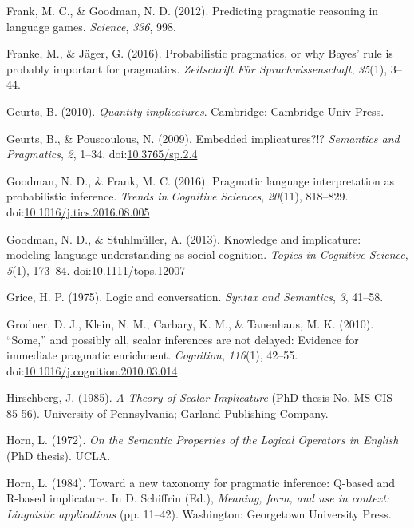 \documentclass[man]{apa6}
\theoremstyle{definition}
\theoremstyle{definition}
\theoremstyle{definition}
\theoremstyle{remark}
\begin{document}
\hypertarget{ref-Frank2012}{}
Frank, M. C., \& Goodman, N. D. (2012). Predicting pragmatic reasoning
in language games. \emph{Science}, \emph{336}, 998.

\hypertarget{ref-Franke2016}{}
Franke, M., \& Jäger, G. (2016). Probabilistic pragmatics, or why Bayes'
rule is probably important for pragmatics. \emph{Zeitschrift Für
Sprachwissenschaft}, \emph{35}(1), 3--44.

\hypertarget{ref-Geurts2010}{}
Geurts, B. (2010). \emph{Quantity implicatures}. Cambridge: Cambridge
Univ Press.

\hypertarget{ref-Geurts2009}{}
Geurts, B., \& Pouscoulous, N. (2009). Embedded implicatures?!?
\emph{Semantics and Pragmatics}, \emph{2}, 1--34.
doi:\href{https://doi.org/10.3765/sp.2.4}{10.3765/sp.2.4}

\hypertarget{ref-Goodman2016}{}
Goodman, N. D., \& Frank, M. C. (2016). Pragmatic language
interpretation as probabilistic inference. \emph{Trends in Cognitive
Sciences}, \emph{20}(11), 818--829.
doi:\href{https://doi.org/10.1016/j.tics.2016.08.005}{10.1016/j.tics.2016.08.005}

\hypertarget{ref-Goodman2013}{}
Goodman, N. D., \& Stuhlmüller, A. (2013). Knowledge and implicature:
modeling language understanding as social cognition. \emph{Topics in
Cognitive Science}, \emph{5}(1), 173--84.
doi:\href{https://doi.org/10.1111/tops.12007}{10.1111/tops.12007}

\hypertarget{ref-grice1975}{}
Grice, H. P. (1975). Logic and conversation. \emph{Syntax and
Semantics}, \emph{3}, 41--58.

\hypertarget{ref-Grodner2010}{}
Grodner, D. J., Klein, N. M., Carbary, K. M., \& Tanenhaus, M. K.
(2010). ``Some,'' and possibly all, scalar inferences are not delayed:
Evidence for immediate pragmatic enrichment. \emph{Cognition},
\emph{116}(1), 42--55.
doi:\href{https://doi.org/10.1016/j.cognition.2010.03.014}{10.1016/j.cognition.2010.03.014}

\hypertarget{ref-Hirschberg1985}{}
Hirschberg, J. (1985). \emph{A Theory of Scalar Implicature} (PhD thesis
No. MS-CIS-85-56). University of Pennsylvania; Garland Publishing
Company.

\hypertarget{ref-Horn1972}{}
Horn, L. (1972). \emph{On the Semantic Properties of the Logical
Operators in English} (PhD thesis). UCLA.

\hypertarget{ref-horn1984}{}
Horn, L. (1984). Toward a new taxonomy for pragmatic inference: Q-based
and R-based implicature. In D. Schiffrin (Ed.), \emph{Meaning, form, and
use in context: Linguistic applications} (pp. 11--42). Washington:
Georgetown University Press.
\end{document}
